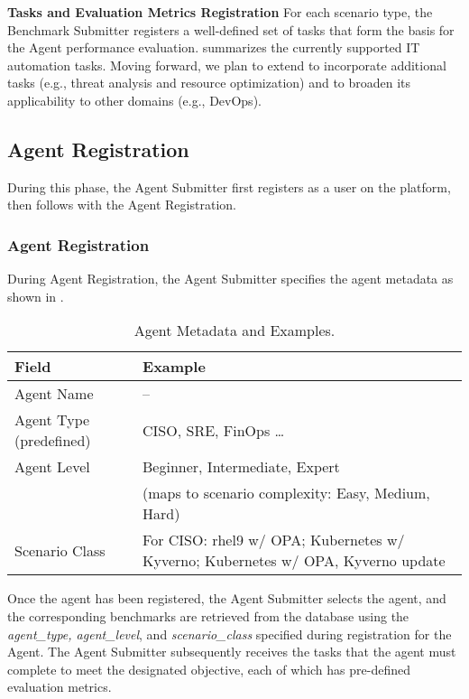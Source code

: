\textbf{Tasks and Evaluation Metrics Registration} For each scenario type, the Benchmark Submitter registers a well-defined set of tasks that form the basis for the Agent performance evaluation.  summarizes the \bench currently supported IT automation tasks. Moving forward, we plan to extend \bench to incorporate additional tasks (e.g., threat analysis and resource optimization) and to broaden its applicability to other domains (e.g., DevOps).


\subsection{Agent Registration}
During this phase, the Agent Submitter first registers as a user on the platform, then follows with the Agent Registration. 

\subsubsection{Agent Registration}
During Agent Registration, the Agent Submitter specifies the agent metadata as shown in .

\begin{table}[htbp]
\begin{threeparttable}
\centering
\caption{Agent Metadata and Examples.}
\label{ss:bench:tab:agent_fields}
\begin{tabular}{@{}lp{4cm}}
\toprule
\textbf{Field} & \textbf{Example} \\
\midrule
Agent Name & -- \\
Agent Type (predefined) & CISO, SRE, FinOps \ldots \\
Agent Level & Beginner, Intermediate, Expert \\
            & (maps to scenario complexity: Easy, Medium, Hard) \\
Scenario Class    %
                  & For CISO: rhel9 w/ OPA; Kubernetes w/ Kyverno; Kubernetes w/ OPA, Kyverno update \\
\end{tabular}
\end{threeparttable}
\end{table}

Once the agent has been registered, the Agent Submitter selects the agent, and the corresponding benchmarks are retrieved from the database using the \textit{agent\_type, agent\_level}, and \textit{scenario\_class} specified during registration for the Agent. 
The Agent Submitter subsequently receives the tasks that the agent must complete to meet the designated objective, each of which has pre-defined evaluation metrics.


